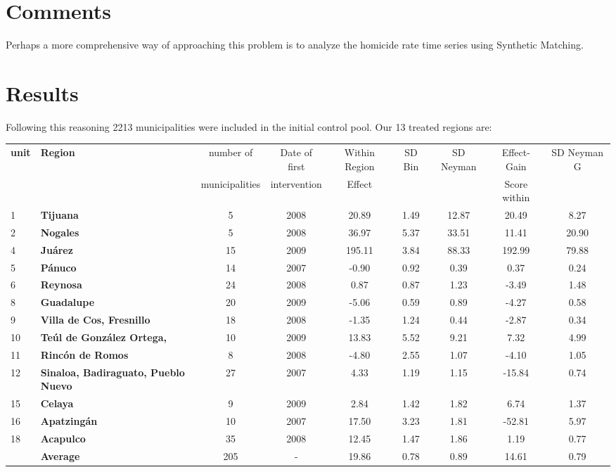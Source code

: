 \documentclass{article}[11 pt]
\begin{document}
\section{Comments}
Perhaps a more comprehensive way of approaching this problem is to analyze the homicide rate time series using Synthetic Matching.

\section{Results}
Following this reasoning 2213 municipalities were included in the initial control pool. Our 13 treated regions are:


\begin{table}[ht]
\begin{center}
\begin{tabular}{llccccccc}
  \hline
 \textbf{unit}& \textbf{Region}& number of& Date of first & Within Region & SD Bin& SD Neyman &Effect- Gain&SD Neyman G\\
 && municipalities& intervention& Effect&&& Score within&\\
  \hline
1&\textbf{Tijuana} &   5 & 2008 &20.89 & 1.49 & 12.87&20.49 & 8.27 \\  
2&		  \textbf{Nogales} &   5 & 2008 &36.97 & 5.37 & 33.51& 11.41 & 20.90 \\
4&		  \textbf{Ju\'{a}rez} &  15 & 2009 & 195.11 & 3.84 & 88.33 & 192.99 & 79.88 \\   
5&		  \textbf{P\'{a}nuco} &  14 & 2007 &  -0.90 & 0.92 & 0.39& 0.37 & 0.24 \\
6&		  \textbf{Reynosa} &  24 & 2008 &  0.87 & 0.87 & 1.23  & -3.49 & 1.48 \\  
8&		  \textbf{Guadalupe} &  20 & 2009 &  -5.06 & 0.59 & 0.89 & -4.27 & 0.58 \\  
9&		  \textbf{Villa de Cos, Fresnillo} &  18 & 2008 &-1.35 & 1.24 & 0.44 & -2.87 & 0.34 \\  
10&		\textbf{Te\'{u}l de Gonz\'{a}lez Ortega,} &10 & 2009&13.83 & 5.52 & 9.21& 7.32 & 4.99 \\ 
11&		\textbf{Rinc\'{o}n de Romos} & 8 & 2008&-4.80 & 2.55 & 1.07& -4.10 & 1.05\\
12&		\textbf{Sinaloa, Badiraguato, Pueblo Nuevo} &27 & 2007& 4.33 & 1.19 & 1.15 & -15.84 & 0.74 \\ 
15&		\textbf{Celaya} &9 & 2009  &2.84 & 1.42 & 1.82& 6.74 & 1.37 \\ 
16&		\textbf{Apatzing\'{a}n} &10 & 2007 &17.50 & 3.23 & 1.81 &-52.81 & 5.97 \\  
18&		\textbf{Acapulco} &35 & 2008 & 12.45 & 1.47 & 1.86 & 1.19 & 0.77 \\ 
&		 \textbf{Average}& 205& - &19.86& 0.78&  0.89&14.61& 0.79\\
\hline
\end{tabular}
\end{center}
\end{table}
	
\end{document}
